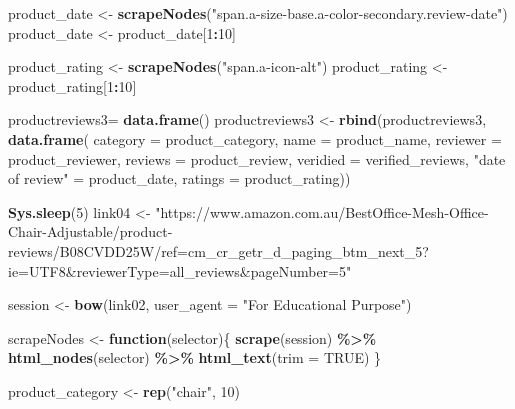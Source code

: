 \documentclass[
]{article}
\newenvironment{Shaded}{\begin{snugshade}}{\end{snugshade}}
\newcommand{\AttributeTok}[1]{\textcolor[rgb]{0.13,0.29,0.53}{#1}}
\newcommand{\ConstantTok}[1]{\textcolor[rgb]{0.56,0.35,0.01}{#1}}
\newcommand{\ControlFlowTok}[1]{\textcolor[rgb]{0.13,0.29,0.53}{\textbf{#1}}}
\newcommand{\DecValTok}[1]{\textcolor[rgb]{0.00,0.00,0.81}{#1}}
\newcommand{\FunctionTok}[1]{\textcolor[rgb]{0.13,0.29,0.53}{\textbf{#1}}}
\newcommand{\NormalTok}[1]{#1}
\newcommand{\OtherTok}[1]{\textcolor[rgb]{0.56,0.35,0.01}{#1}}
\newcommand{\SpecialCharTok}[1]{\textcolor[rgb]{0.81,0.36,0.00}{\textbf{#1}}}
\newcommand{\StringTok}[1]{\textcolor[rgb]{0.31,0.60,0.02}{#1}}
\begin{document}
\begin{Shaded}
\begin{Highlighting}[]
\NormalTok{  product\_date }\OtherTok{\textless{}{-}} \FunctionTok{scrapeNodes}\NormalTok{(}\StringTok{"span.a{-}size{-}base.a{-}color{-}secondary.review{-}date"}\NormalTok{)}
\NormalTok{  product\_date }\OtherTok{\textless{}{-}}\NormalTok{ product\_date[}\DecValTok{1}\SpecialCharTok{:}\DecValTok{10}\NormalTok{]}
  
\NormalTok{  product\_rating }\OtherTok{\textless{}{-}} \FunctionTok{scrapeNodes}\NormalTok{(}\StringTok{"span.a{-}icon{-}alt"}\NormalTok{)}
\NormalTok{  product\_rating }\OtherTok{\textless{}{-}}\NormalTok{ product\_rating[}\DecValTok{1}\SpecialCharTok{:}\DecValTok{10}\NormalTok{]}
  
\NormalTok{  productreviews3}\OtherTok{=} \FunctionTok{data.frame}\NormalTok{()}
\NormalTok{  productreviews3 }\OtherTok{\textless{}{-}} \FunctionTok{rbind}\NormalTok{(productreviews3, }\FunctionTok{data.frame}\NormalTok{(}
                      \AttributeTok{category =}\NormalTok{ product\_category,}
                      \AttributeTok{name =}\NormalTok{ product\_name,}
                      \AttributeTok{reviewer =}\NormalTok{ product\_reviewer,}
                      \AttributeTok{reviews =}\NormalTok{ product\_review,}
                      \AttributeTok{veridied =}\NormalTok{ verified\_reviews,}
                      \StringTok{"date of review"} \OtherTok{=}\NormalTok{ product\_date,}
                      \AttributeTok{ratings =}\NormalTok{ product\_rating))}
  
   \FunctionTok{Sys.sleep}\NormalTok{(}\DecValTok{5}\NormalTok{)}
\NormalTok{link04 }\OtherTok{\textless{}{-}} \StringTok{"https://www.amazon.com.au/BestOffice{-}Mesh{-}Office{-}Chair{-}Adjustable/product{-}reviews/B08CVDD25W/ref=cm\_cr\_getr\_d\_paging\_btm\_next\_5?ie=UTF8\&reviewerType=all\_reviews\&pageNumber=5"}


\NormalTok{  session }\OtherTok{\textless{}{-}} \FunctionTok{bow}\NormalTok{(link02,}
               \AttributeTok{user\_agent =} \StringTok{"For Educational Purpose"}\NormalTok{)}

\NormalTok{  scrapeNodes }\OtherTok{\textless{}{-}} \ControlFlowTok{function}\NormalTok{(selector)\{}
    \FunctionTok{scrape}\NormalTok{(session) }\SpecialCharTok{\%\textgreater{}\%}
      \FunctionTok{html\_nodes}\NormalTok{(selector) }\SpecialCharTok{\%\textgreater{}\%}
      \FunctionTok{html\_text}\NormalTok{(}\AttributeTok{trim =} \ConstantTok{TRUE}\NormalTok{)}
\NormalTok{  \}}

\NormalTok{  product\_category }\OtherTok{\textless{}{-}} \FunctionTok{rep}\NormalTok{(}\StringTok{"chair"}\NormalTok{, }\DecValTok{10}\NormalTok{)}


\end{Highlighting}
\end{Shaded}
\end{document}
